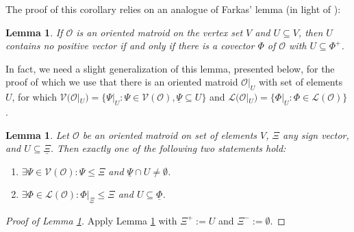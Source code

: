 \documentclass[a4paper,11pt,reqno, english]{amsart}
\newtheorem{lemma}[theorem]{Lemma}
\theoremstyle{definition}
\theoremstyle{remark}
\begin{document}
The proof of this corollary relies on an analogue of Farkas' lemma \cite[Proposition 3.4.8]{OrientedMatroids} (in light of \cite[Lemma 4.1.8]{OrientedMatroids}):
\begin{lemma}\label{lem:acyclic-oms}
    If $\mathscr{O}$ is an oriented matroid on the vertex set $V$ and $U\subseteq V$, then $U$ contains no positive vector if and only if there is a covector $\Phi$ of $\mathscr{O}$ with $U\subseteq\Phi^+$.
\end{lemma}
In fact, we need a slight generalization of this lemma, presented below, for the proof of which we use that there is an oriented matroid $\mathscr{O}|_U$ with set of elements $U$, for which $\mathscr{V}(\mathscr{O}|_U)=\{\Psi|_U:\Psi\in\mathscr{V}(\mathscr{O}),\underline{\Psi}\subseteq U\}$ \cite[Proposition 3.7.11]{OrientedMatroids} and $\mathscr{L}(\mathscr{O}|_U)=\{\Phi|_U:\Phi\in\mathscr{L}(\mathscr{O})\}$ \cite[Lemma 4.1.8]{OrientedMatroids}.
\begin{lemma}\label{lem:general-vector-covector-duality}
    Let $\mathscr{O}$ be an oriented matroid on set of elements $V$, $\Xi$ any sign vector, and $U\subseteq\underline{\Xi}$. Then exactly one of the following two statements hold:
    \begin{enumerate}[label=\normalfont{(\roman*)}]
        \item\label{lem:general-vector-covector-duality:vector} $\exists\Psi\in\mathscr{V}(\mathscr{O}):\Psi\leq\Xi$ and $\underline{\Psi}\cap U\neq\emptyset$.
        \item\label{lem:general-vector-covector-duality:covector} $\exists\Phi\in\mathscr{L}(\mathscr{O}):\Phi|_{\underline{\Xi}}\leq\Xi$ and $U\subseteq\underline{\Phi}$.
    \end{enumerate}
\end{lemma}
\begin{proof}[Proof of Lemma \ref{lem:acyclic-oms}]
    Apply Lemma \ref{lem:general-vector-covector-duality} with $\Xi^+:=U$ and $\Xi^-:=\emptyset$.
\end{proof}
\end{document}

